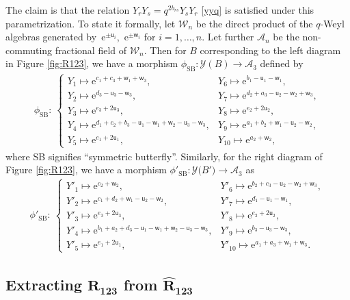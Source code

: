\documentclass[11pt]{article}
\numberwithin{equation}{section}
\newcommand{\e}{{\mathrm e}}
\newcommand{\uu}{{\mathsf u}}
\newcommand{\ww}{{\mathsf w}}
\numberwithin{equation}{section}
\begin{document}
The claim is that the relation
$Y_r Y_s = q^{2b_{rs}}Y_sY_r$ \eqref{yyq} is satisfied under this parametrization.
%
To state it formally, let $\mathcal{W}_n$ be the direct product of the
$q$-Weyl algebras generated by~$\e^{\pm \uu_i}$,~$\e^{\pm \ww_i}$ for
$i=1, \dots, n$. Let further $\mathcal{A}_n$ be the non-commuting
fractional field of $\mathcal{W}_n$. Then for $B$ corresponding to
the left diagram in Figure \ref{fig:R123}, we have a morphism
$\phi_\mathrm{SB}\colon \mathcal{Y}(B) \rightarrow \mathcal{A}_3$
defined by
\begin{align}
\phi_\mathrm{SB}\colon\
\begin{cases}
Y_1 \mapsto \e^{c_1+c_3+\ww_1+\ww_3},
& Y_6 \mapsto \e^{b_1-\uu_1-\ww_1},
\\
Y_2 \mapsto \e^{d_3-\uu_3-\ww_3},
& Y_7 \mapsto \e^{d_2+a_3-\uu_2-\ww_2+\ww_3},
\\
Y_3 \mapsto \e^{e_3+2\uu_3},
& Y_8 \mapsto \e^{e_2+2\uu_2},
\\
Y_4 \mapsto \e^{d_1+c_2+b_3-\uu_1-\ww_1+\ww_2-\uu_3-\ww_3},
& Y_9 \mapsto \e^{a_1+b_2+\ww_1-\uu_2-\ww_2},
\\
Y_5 \mapsto \e^{e_1+2\uu_1},
& Y_{10} \mapsto \e^{a_2+\ww_2},
\end{cases}
\label{Yw}
\end{align}
where SB signifies ``symmetric butterfly''. Similarly, for the right
diagram of Figure \ref{fig:R123}, we have a morphism
$\phi'_\mathrm{SB}\colon \mathcal{Y}\bigl(B'\bigr) \rightarrow \mathcal{A}_3$ as
\begin{align}
\phi'_\mathrm{SB}\colon\
\begin{cases}
Y'_1 \mapsto \e^{c_2+\ww_2},
& Y'_6 \mapsto \e^{b_2+c_3-\uu_2-\ww_2+\ww_3},
\\
Y'_2 \mapsto \e^{c_1+d_2+\ww_1-\uu_2-\ww_2},
& Y'_7 \mapsto \e^{d_1-\uu_1-\ww_1},
\\
Y'_3 \mapsto \e^{e_3+2\uu_3},
& Y'_8 \mapsto \e^{e_2+2\uu_2},
\\
Y'_4 \mapsto \e^{b_1+a_2+d_3-\uu_1-\ww_1+\ww_2-\uu_3-\ww_3},
& Y'_9 \mapsto \e^{b_3-\uu_3-\ww_3},
\\
Y'_5 \mapsto \e^{e_1+2\uu_1},
& Y'_{10} \mapsto \e^{a_1+a_3+\ww_1+\ww_3}.
\end{cases}
\label{Ypw}
\end{align}

\setcounter{Theorem}{1}\setcounter{equation}{6}
\subsection[Extracting R\_123 from R\_123]{Extracting $\boldsymbol{R_{123}}$ from $\boldsymbol{\widehat{R}_{123}}$}
\end{document}
